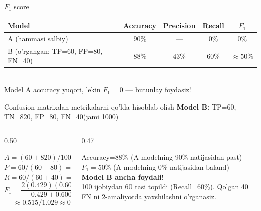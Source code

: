 \documentclass[aspectratio=169,11pt]{beamer}
\begin{document}
\begin{frame}{$F_1$ score}
  \begin{tcolorbox}[defbox,title=Ikki model taqqoslash (900 salbiy / 100 ijobiy)]
    \footnotesize
    \begin{tabular}{@{}lcccc@{}}
      \toprule
      Model & Accuracy & Precision & Recall & $F_1$ \\
      \midrule
      A (hammasi salbiy) &
        $90\%$ & --- & $0\%$ & \textcolor{deepred}{$0\%$} \\
      B (o'rgangan;\; TP=60, FP=80, FN=40) &
        $88\%$ & $43\%$ & $60\%$ &
        \textcolor{deepgreen}{$\approx\!50\%$} \\
      \bottomrule
    \end{tabular}
    \vspace{2pt}\\
    \textcolor{halfgray}{Model A accuracy yuqori,
    lekin $F_1{=}0$ --- butunlay foydasiz!}
  \end{tcolorbox}
\end{frame}

\begin{frame}{Confusion matrixdan metrikalarni qo'lda hisoblab olish}
  \small
  \textbf{Model B:}\;
  TP=60,\; TN=820,\; FP=80,\; FN=40\quad (jami 1000)
  \vspace{5pt}
  \begin{columns}[T]
    \begin{column}{0.50\textwidth}
      \begin{tcolorbox}[defbox,title=Hisoblar (qo'lda)]
        \small
        $A=(60+820)/1000=0.88$\\[4pt]
        $P=60/(60+80)=60/140\approx 0.429$\\[4pt]
        $R=60/(60+40)=60/100=0.600$\\[4pt]
        $F_1=\dfrac{2(0.429)(0.600)}{0.429+0.600}$\\[4pt]
        $\quad\;\approx 0.515/1.029\approx\mathbf{0.500}$
      \end{tcolorbox}
    \end{column}
    \begin{column}{0.47\textwidth}
      \begin{tcolorbox}[okbox,title=Xulosa]
        \small
        Accuracy=88\% (A modelning 90\% natijasidan past)\\[3pt]
        $F_1=50\%$ (A modelning 0\% natijasidan baland)\\[4pt]
        \textbf{Model B ancha foydali!}\\[4pt]
        \textcolor{halfgray}{\footnotesize
          100 ijobiydan 60 tasi topildi (Recall=60\%).
          Qolgan 40 FN ni 2-amaliyotda yaxshilashni o'rganasiz.}
      \end{tcolorbox}
    \end{column}
  \end{columns}
\end{frame}
\end{document}
